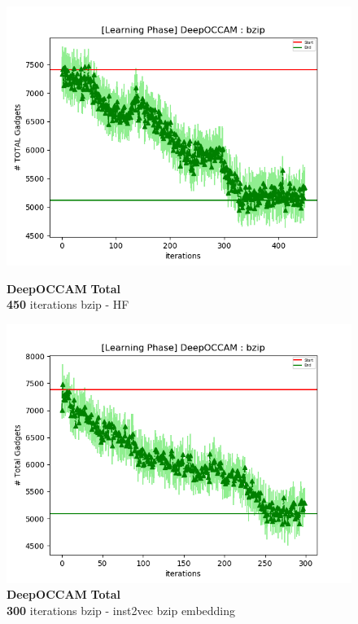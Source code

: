 \documentclass{relatorio}
\begin{document}
\begin{figure}[H]
	\centering
	\captionsetup{justification=centering}
	\includegraphics[width=1\linewidth]{imgs/deepoccam_HF_learning_bzip_TOTAL_plot.png}
	\caption{\textbf{DeepOCCAM} \textbf{Total} \\ \textbf{450} iterations \color{blue} bzip - HF}%
	\label{fig:plant}
	\centering
	\captionsetup{justification=centering}
	\includegraphics[width=1\linewidth]{imgs/deepoccam_inst2vec_bzip_Total_plot.png}
	\caption{\textbf{DeepOCCAM} \textbf{Total} \\ \textbf{300} iterations \color{blue} bzip - inst2vec bzip embedding}%
	\label{fig:plant}
	\centering
	\captionsetup{justification=centering}

\end{figure}
\end{document}
